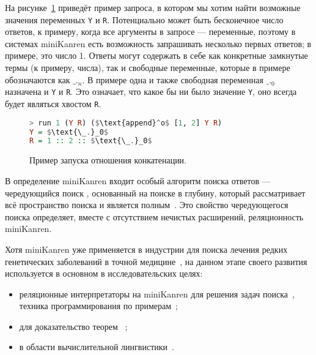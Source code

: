 На рисунке~\ref{fig:appendoExample} приведёт пример запроса, в котором мы хотим
найти возможные значения переменных \lstinline{Y} и \lstinline{R}. Потенциально
может быть бесконечное число ответов, к примеру, когда все аргументы в запросе
--- переменные, поэтому в системах miniKanren есть возможность запрашивать
несколько первых ответов; в примере, это число 1. Ответы могут содержать в себе
как конкретные замкнутые термы (к примеру, числа), так и свободные переменные,
которые в примере обозначаются как $\text{\_.}_n$. В примере одна и также
свободная переменная $\text{\_.}_0$ назначена и \lstinline{Y} и \lstinline{R}.
Это означает, что какое бы ни было значение \lstinline{Y}, оно всегда будет
являться хвостом \lstinline{R}.

\begin{figure}[h!]
\begin{lstlisting}[mathescape,language=Haskell,extendedchars=\true,frame=single,basicstyle=\ttfamily]
> run 1 (Y R) ($\text{append}^o$ [1, 2] Y R)
Y = $\text{\_.}_0$
R = 1 :: 2 :: $\text{\_.}_0$
\end{lstlisting}
\caption{Пример запуска отношения конкатенации.}
\label{fig:appendoExample}
\end{figure}

В определение miniKanren входит особый алгоритм поиска ответов --- чередующийся
поиск , основанный на поиске в глубину,
который рассматривает всё пространство поиска и является
полным~\cite{interleaving}.
Это свойство чередующегося поиска определяет, вместе с отсутствием
нечистых расширений, реляционность miniKanren. 

Хотя miniKanren уже применяется в индустрии для поиска лечения редких
генетических заболеваний в точной медицине~\cite{medMK},
на данном этапе своего развития используется в основном в исследовательских
целях:
\begin{itemize}
\item реляционные интерпретаторы на miniKanren для решения задач поиска~\cite{lozov},
      техника программирования по примерам~\cite{unifiedMK};
\item для доказательство теорем~\cite{mkProver} ;
\item в области вычислительной лингвистики~\cite{mkLing}.
\end{itemize}

